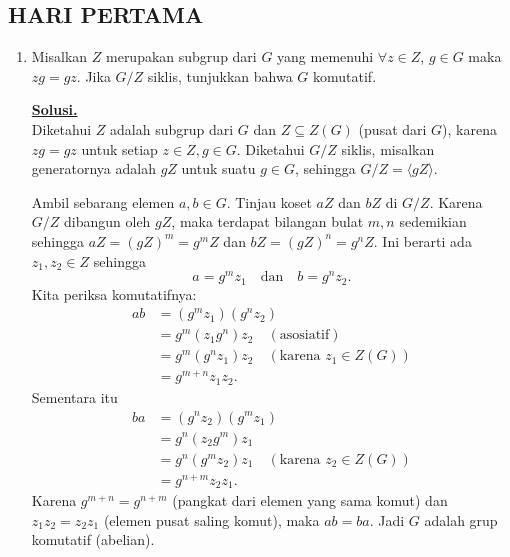 \documentclass[12pt,twoside]{article}
\newenvironment{solution}
{
	\par\noindent\textbf{\underline{Solusi.}}\\
}
{
	\par
}
\begin{document}
\subsection{HARI PERTAMA}
\begin{enumerate}

  \item Misalkan $Z$ merupakan subgrup dari $G$ yang memenuhi $\forall z\in Z$, $g\in G$ maka $zg=gz$. Jika $G/Z$ siklis, tunjukkan bahwa $G$ komutatif.
        \begin{solution}
          Diketahui $Z$ adalah subgrup dari $G$ dan $Z\subseteq Z(G)$ (pusat dari $G$), karena $zg=gz$ untuk setiap $z\in Z, g\in G$.
          Diketahui $G/Z$ siklis, misalkan generatornya adalah $gZ$ untuk suatu $g\in G$, sehingga $G/Z=\langle gZ\rangle$.

          Ambil sebarang elemen $a,b\in G$. Tinjau koset $aZ$ dan $bZ$ di $G/Z$. Karena $G/Z$ dibangun oleh $gZ$, maka terdapat bilangan bulat $m,n$ sedemikian sehingga $aZ=(gZ)^m=g^mZ$ dan $bZ=(gZ)^n=g^nZ$.
          Ini berarti ada $z_1,z_2\in Z$ sehingga
          \[
            a=g^mz_1 \quad\text{dan}\quad b=g^nz_2.
          \]
          Kita periksa komutatifnya:
          \begin{align*}
            ab & = (g^mz_1)(g^nz_2)                                  \\
               & = g^m(z_1g^n)z_2 \quad (\text{asosiatif})           \\
               & = g^m(g^nz_1)z_2 \quad (\text{karena } z_1\in Z(G)) \\
               & = g^{m+n}z_1z_2.
          \end{align*}
          Sementara itu
          \begin{align*}
            ba & = (g^nz_2)(g^mz_1)                                  \\
               & = g^n(z_2g^m)z_1                                    \\
               & = g^n(g^mz_2)z_1 \quad (\text{karena } z_2\in Z(G)) \\
               & = g^{n+m}z_2z_1.
          \end{align*}
          Karena $g^{m+n}=g^{n+m}$ (pangkat dari elemen yang sama komut) dan $z_1z_2=z_2z_1$ (elemen pusat saling komut), maka $ab=ba$.
          Jadi $G$ adalah grup komutatif (abelian).
        \end{solution}


\end{enumerate}
\end{document}
